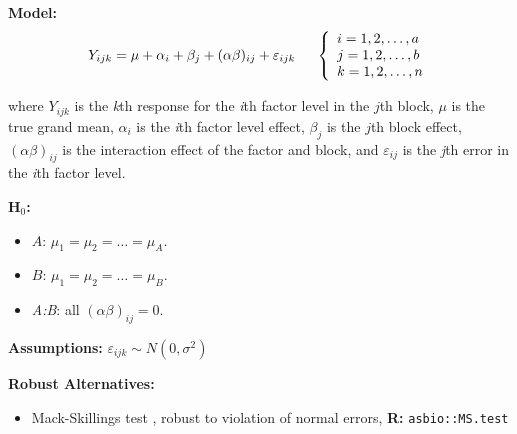 \documentclass[12pt,english]{article}\usepackage[]{graphicx}\usepackage[table]{xcolor}
\begin{document}
\textbf{Model:} \[Y_{ijk} = \mu + \alpha_i + \beta_j +  (\alpha\beta)_{ij} + \varepsilon_{ijk}\hspace{0.2in} \left\{
                \begin{array}{ll}
                  i = 1,2,\dots,a\\
                  j = 1,2,\dots,b\\
                  k = 1,2,\dots, n\\
                                 \end{array}
              \right.\]

\noindent where $Y_{ijk}$ is the \textit{k}th response for the \textit{i}th factor level in the $j$th block, $\mu$ is the true grand mean, $\alpha_i$ is the \textit{i}th factor level effect, $\beta_j$ is the $j$th block effect, $(\alpha\beta)_{ij}$ is the interaction effect of the factor and block, and $\varepsilon_{ij}$ is the \textit{j}th error in the \textit{i}th factor level. \\
\vspace{0.05in}

\noindent \textbf{H$_0$:}
\begin{itemize}
\item $A$: $\mu_1 = \mu_2 = \dots = \mu_A$.
\item $B$: $\mu_1 = \mu_2 = \dots = \mu_B$.
\item \textit{A:B}: all $(\alpha\beta)_{ij} = 0$.
\end{itemize}
\vspace{0.1in}

\noindent \textbf{Assumptions:} $\varepsilon_{ijk} \sim N(0, \sigma^2)$
\vspace{0.1in}

\noindent \textbf{Robust Alternatives:}
\begin{small}
\begin{itemize}
\item Mack-Skillings test \citep{mack1980}, robust to violation of normal errors, \textbf{R:} \texttt{asbio::MS.test}
\end{itemize}
\end{small}
\vspace{0.1in}
\end{document}
